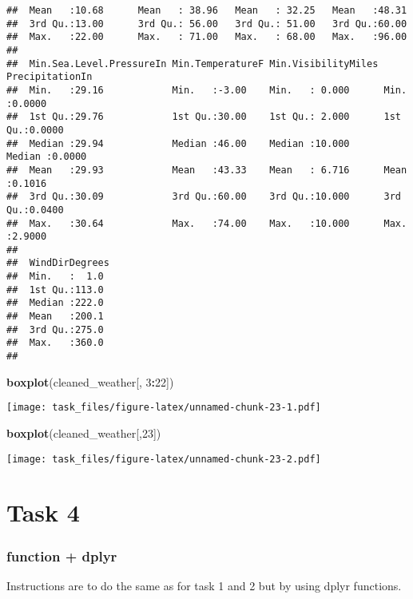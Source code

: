 \documentclass[
]{article}
\newenvironment{Shaded}{\begin{snugshade}}{\end{snugshade}}
\newcommand{\DecValTok}[1]{\textcolor[rgb]{0.00,0.00,0.81}{#1}}
\newcommand{\KeywordTok}[1]{\textcolor[rgb]{0.13,0.29,0.53}{\textbf{#1}}}
\newcommand{\NormalTok}[1]{#1}
\newcommand{\OperatorTok}[1]{\textcolor[rgb]{0.81,0.36,0.00}{\textbf{#1}}}
\begin{document}
\begin{verbatim}
##  Mean   :10.68      Mean   : 38.96   Mean   : 32.25   Mean   :48.31  
##  3rd Qu.:13.00      3rd Qu.: 56.00   3rd Qu.: 51.00   3rd Qu.:60.00  
##  Max.   :22.00      Max.   : 71.00   Max.   : 68.00   Max.   :96.00  
##                                                                      
##  Min.Sea.Level.PressureIn Min.TemperatureF Min.VisibilityMiles PrecipitationIn 
##  Min.   :29.16            Min.   :-3.00    Min.   : 0.000      Min.   :0.0000  
##  1st Qu.:29.76            1st Qu.:30.00    1st Qu.: 2.000      1st Qu.:0.0000  
##  Median :29.94            Median :46.00    Median :10.000      Median :0.0000  
##  Mean   :29.93            Mean   :43.33    Mean   : 6.716      Mean   :0.1016  
##  3rd Qu.:30.09            3rd Qu.:60.00    3rd Qu.:10.000      3rd Qu.:0.0400  
##  Max.   :30.64            Max.   :74.00    Max.   :10.000      Max.   :2.9000  
##                                                                                
##  WindDirDegrees 
##  Min.   :  1.0  
##  1st Qu.:113.0  
##  Median :222.0  
##  Mean   :200.1  
##  3rd Qu.:275.0  
##  Max.   :360.0  
## 
\end{verbatim}

\begin{Shaded}
\begin{Highlighting}[]
\KeywordTok{boxplot}\NormalTok{(cleaned_weather[, }\DecValTok{3}\OperatorTok{:}\DecValTok{22}\NormalTok{])}
\end{Highlighting}
\end{Shaded}

\texttt{[image: task\_files/figure-latex/unnamed-chunk-23-1.pdf]}

\begin{Shaded}
\begin{Highlighting}[]
\KeywordTok{boxplot}\NormalTok{(cleaned_weather[,}\DecValTok{23}\NormalTok{])}
\end{Highlighting}
\end{Shaded}

\texttt{[image: task\_files/figure-latex/unnamed-chunk-23-2.pdf]}

\hypertarget{task-4}{%
\section{Task 4}\label{task-4}}

\hypertarget{function-dplyr}{%
\subsubsection{function + dplyr}\label{function-dplyr}}

Instructions are to do the same as for task 1 and 2 but by using dplyr
functions.
\end{document}
